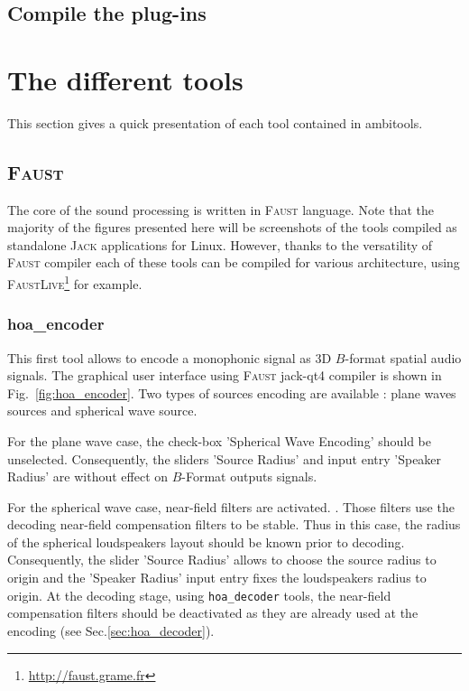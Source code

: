 \documentclass[10pt,a4paper]{article}
\begin{document}
\subsection{Compile the plug-ins}

\section{The different tools}
This section gives a quick presentation of each tool contained in ambitools. 
\subsection{\textsc{Faust}}
The core of the sound processing is written in \textsc{Faust} language. Note that the majority of the figures presented here will be screenshots of the tools compiled as standalone \textsc{Jack} applications for Linux. However, thanks to the versatility of \textsc{Faust} compiler each of these tools can be compiled for various architecture, using \textsc{FaustLive}\footnote{\url{http://faust.grame.fr}} for example. 

\subsubsection{hoa\_encoder}
\label{sec:hoa_encoder}
This first tool allows to encode a monophonic signal as 3D $B$-format spatial audio signals. The graphical user interface using \textsc{Faust} jack-qt4 compiler is shown in Fig.~\ref{fig:hoa_encoder}. Two types of sources encoding are available : plane waves sources and spherical wave source. 

For the plane wave case, the check-box 'Spherical Wave Encoding' should be unselected. Consequently, the sliders 'Source Radius' and input entry 'Speaker Radius' are without effect on $B$-Format outputs signals.

For the spherical wave case, near-field filters are activated. \cite{daniel2003spatial,lecomte2015real}. Those filters use the decoding near-field compensation filters to be stable. Thus in this case, the radius of the spherical loudspeakers layout should be known prior to decoding. Consequently, the slider 'Source Radius' allows to choose the source radius to origin and the 'Speaker Radius' input entry fixes the loudspeakers radius to origin. At the decoding stage, using \lstinline'hoa_decoder' tools, the near-field compensation filters should be deactivated as they are already used at the encoding (see Sec.\ref{sec:hoa_decoder}).
\end{document}
